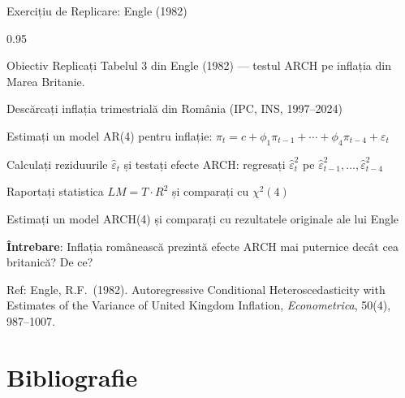 \documentclass[9pt, aspectratio=169, t]{beamer}
\begin{document}
\begin{frame}{Exercițiu de Replicare: Engle (1982)}
    \begin{cminipage}{0.95\textwidth}
        \begin{block}{Obiectiv}
            Replicați Tabelul 3 din Engle (1982) --- testul ARCH pe inflația din Marea Britanie.
        \end{block}
        \begin{enumerate}\setlength{\itemsep}{2pt}
            {\small
            \item Descărcați inflația trimestrială din România (IPC, INS, 1997--2024)
            \item Estimați un model AR(4) pentru inflație: $\pi_t = c + \phi_1 \pi_{t-1} + \cdots + \phi_4 \pi_{t-4} + \varepsilon_t$
            \item Calculați reziduurile $\hat{\varepsilon}_t$ și testați efecte ARCH: regresați $\hat{\varepsilon}_t^2$ pe $\hat{\varepsilon}_{t-1}^2, \ldots, \hat{\varepsilon}_{t-4}^2$
            \item Raportați statistica $LM = T \cdot R^2$ și comparați cu $\chi^2(4)$
            \item Estimați un model ARCH(4) și comparați cu rezultatele originale ale lui Engle
            \item \textbf{Întrebare}: Inflația românească prezintă efecte ARCH mai puternice decât cea britanică? De ce?
            }
        \end{enumerate}
        {\tiny Ref: Engle, R.F.\ (1982). Autoregressive Conditional Heteroscedasticity with Estimates of the Variance of United Kingdom Inflation, \textit{Econometrica}, 50(4), 987--1007.}
    \end{cminipage}
\end{frame}
\section{Bibliografie}
\end{document}
